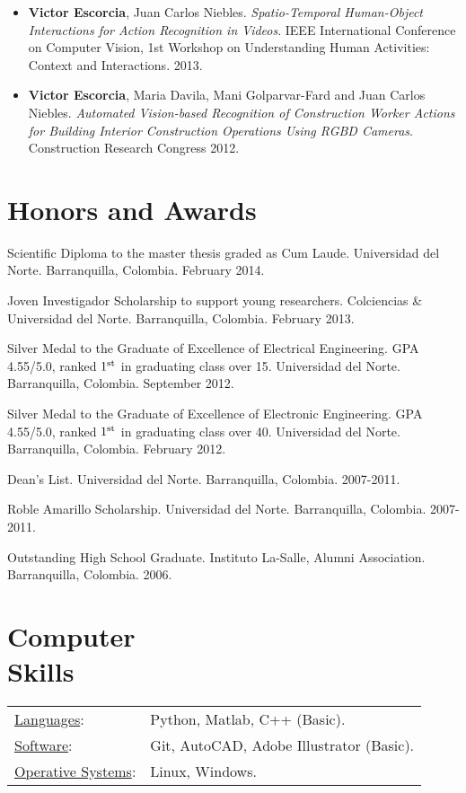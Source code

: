 \documentclass[margin]{res}
\begin{document}
\begin{resume}
\begin{itemize}
\item \textbf{Victor Escorcia}, Juan Carlos Niebles.
\textit{Spatio-Temporal Human-Object Interactions for Action Recognition
in Videos}.
IEEE International Conference on Computer Vision, 1st Workshop on
Understanding Human Activities: Context and Interactions. 2013.
\smallskip

\item \textbf{Victor Escorcia}, Maria Davila, Mani Golparvar-Fard and
Juan Carlos Niebles.
\textit{Automated Vision-based Recognition of Construction Worker
Actions for Building Interior Construction Operations Using RGBD Cameras}.
Construction Research Congress 2012.

\end{itemize}
               

\section{Honors and Awards}
Scientific Diploma to the master thesis graded as Cum Laude.
Universidad del Norte. Barranquilla, Colombia. February 2014.

Joven Investigador Scholarship to support young researchers.
Colciencias \& Universidad del Norte. Barranquilla, Colombia. February 2013.

Silver Medal to the Graduate of Excellence of Electrical Engineering.
GPA 4.55/5.0, ranked ${1^{{\rm{st}}}}$ in graduating class over 15.
Universidad del Norte. Barranquilla, Colombia. September 2012.

Silver Medal to the Graduate of Excellence of Electronic Engineering.
GPA 4.55/5.0, ranked ${1^{{\rm{st}}}}$ in graduating class over 40.
Universidad del Norte. Barranquilla, Colombia. February 2012.

Dean's List. Universidad del Norte. Barranquilla, Colombia. 2007-2011.

Roble Amarillo Scholarship. Universidad del Norte. 
Barranquilla, Colombia. 2007-2011.

Outstanding High School Graduate. Instituto La-Salle, Alumni Association.
Barranquilla, Colombia. 2006.


\section{Computer \\ Skills}
   \begin{tabular}{l p{3in}}
    \underline{Languages}: & Python, Matlab, C++ (Basic). \\

    \underline{Software}: & Git, AutoCAD, Adobe Illustrator (Basic). \\
    
    \underline{Operative Systems}: & Linux, Windows. \\
 \end{tabular}

\end{resume} 
\end{document}
